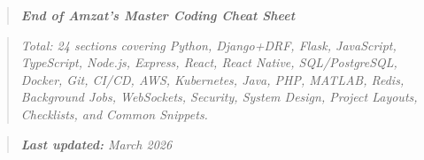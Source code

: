 \documentclass[10pt, a4paper]{article}
\begin{document}
\bigskip


\begin{quote}
\textit{\textbf{End of Amzat's Master Coding Cheat Sheet}}
\end{quote}

\begin{quote}
\textit{Total: 24 sections covering Python, Django+DRF, Flask, JavaScript, TypeScript, Node.js, Express, React, React Native, SQL/PostgreSQL, Docker, Git, CI/CD, AWS, Kubernetes, Java, PHP, MATLAB, Redis, Background Jobs, WebSockets, Security, System Design, Project Layouts, Checklists, and Common Snippets.}
\end{quote}

\begin{quote}
\textit{\textbf{Last updated:} March 2026}
\end{quote}
\end{document}
